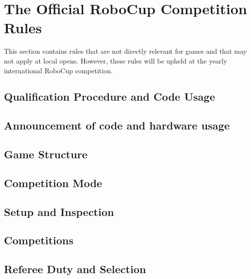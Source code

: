 \section{The Official RoboCup Competition Rules}
\label{sec:robocup_rules}

This section contains rules that are not directly relevant for games and that may not apply at local opens.
However, these rules will be upheld at the yearly international RoboCup competition.

\subsection{Qualification Procedure and Code Usage}
\label{sec:qualification}

\subsection{Announcement of code and hardware usage}
\label{sec:code_and_hardware}

\subsection{Game Structure}
\label{sec:game_structure}

\subsection{Competition Mode}
\label{sec:competition_mode}

\subsection{Setup and Inspection}
\label{sec:setup_and_inspection}

\subsection{Competitions}
\label{sec:competitions}


\subsection{Referee Duty and Selection}
\label{sec:referee_duty}

